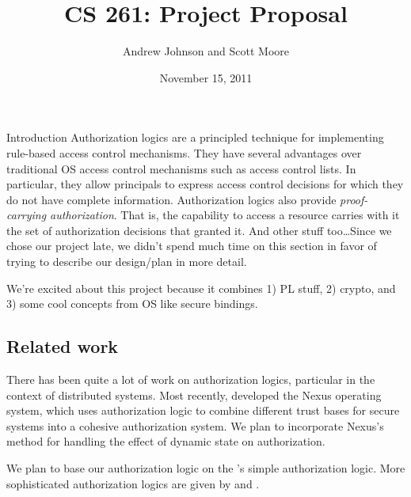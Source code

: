 \documentclass[10pt]{article}
\begin{document}
\title{CS 261: Project Proposal}
\author{Andrew Johnson and Scott Moore}
\date{November 15, 2011}

\maketitle

\thispagestyle{empty}

\begin{section}{Introduction}
Authorization logics are a principled technique for implementing rule-based access control mechanisms.
They have several advantages over traditional OS access control mechanisms such as access control lists.
In particular, they allow principals to express access control decisions for which they do not have complete information.
Authorization logics also provide \emph{proof-carrying authorization}. That is, the capability to access a resource carries with it the set of authorization decisions that granted it.
And other stuff too\ldots Since we chose our project late, we didn't spend much time on this section in favor of trying to describe our design/plan in more detail.

We're excited about this project because it combines 1) PL stuff, 2) crypto, and 3) some cool concepts from OS like secure bindings.

\subsection{Related work}
There has been quite a lot of work on authorization logics, particular in the context of distributed systems.
Most recently, \citet{Nexus} developed the Nexus operating system, which uses authorization logic to combine different trust bases for secure systems into a cohesive authorization system.
We plan to incorporate Nexus's method for handling the effect of dynamic state on authorization.

We plan to base our authorization logic on the \citet{Bauer}'s simple authorization logic.
More sophisticated authorization logics are given by \citet{AURA} and \citet{Garg}.
\end{section}
\end{document}
